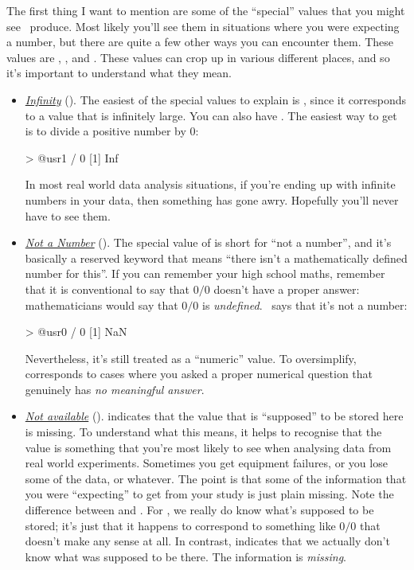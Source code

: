 
The first thing I want to mention are some of the ``special'' values that you might see \R\ produce. Most likely you'll see them in situations where you were expecting a number, but there are quite a few other ways you can encounter them. These values are , ,  and . These values can crop up in various different places, and so it's important to understand what they mean. 

\begin{itemize}

\item \underline{\it Infinity} (). The easiest of the special values to explain is , since it corresponds to a value that is infinitely large. You can also have . The easiest way to get  is to divide a positive number by 0:
\begin{rblock1}
> @usr{1 / 0}
[1] Inf
\end{rblock1}
In most real world data analysis situations, if you're ending up with infinite numbers in your data, then something has gone awry. Hopefully you'll never have to see them.
\vspace*{6pt}

\item \underline{\it Not a Number} (). The special value of  is short for ``not a number'', and it's basically a reserved keyword that means ``there isn't a mathematically defined number for this''. If you can remember your high school maths, remember that it is conventional to say that $0/0$ doesn't have a proper answer: mathematicians would say that $0/0$ is {\it undefined}. \R\ says that it's not a number:
\begin{rblock1}
> @usr{0 / 0}
[1] NaN
\end{rblock1}
Nevertheless, it's still treated as a ``numeric'' value. To oversimplify,  corresponds to cases where you asked a proper numerical question that genuinely has {\it no meaningful answer}. 
\vspace*{6pt}


\item \underline{\it Not available} (). 
 indicates that the value that is ``supposed'' to be stored here is missing. To understand what this means, it helps to recognise that the  value is something that you're most likely to see when analysing data from real world experiments. Sometimes you get equipment failures, or you lose some of the data, or whatever. The point is that some of the information that you were ``expecting'' to get from your study is just plain missing. Note the difference between  and . For , we really do know what's supposed to be stored; it's just that it happens to correspond to something like $0/0$ that doesn't make any sense at all. In contrast,  indicates that we actually don't know what was supposed to be there. The information is {\it missing}.
\vspace*{6pt}


\end{itemize}
